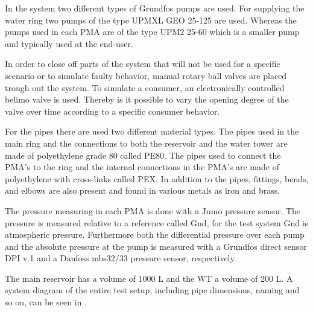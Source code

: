 In the system two different types of Grundfos pumps are used. For supplying the water ring two pumps of the type UPMXL GEO 25-125 are used. Whereas the pumps used in each PMA are of the type UPM2 25-60 which is a smaller pump and typically used at the end-user. 

In order to close off parts of the system that will not be used for a specific scenario or to simulate faulty behavior, manual rotary ball valves are placed trough out the system. 
To simulate a consumer, an electronically controlled belimo valve is used. Thereby is it possible to vary the opening degree of the valve over time according to a specific consumer behavior.   

For the pipes there are used two different material types. The pipes used in the main ring and the connections to both the reservoir and the water tower are made of polyethylene grade 80 called PE80. The pipes used to connect the PMA's to the ring and the internal connections in the PMA's are made of polyethylene with cross-links called PEX. In addition to the pipes, fittings, bends, and elbows are also present and found in various metals as iron and brass.     

The pressure measuring in each PMA is done with a Jumo pressure sensor. The pressure is measured relative to a reference called Gnd, for the test system Gnd is atmospheric pressure. Furthermore both the differential pressure over each pump and the absolute pressure at the pump is measured with a Grundfos direct sensor DPI v.1 and a Danfoss mbs32/33 pressure sensor, respectively.    

The main reservoir has a volume of 1000 L and the WT a volume of 200 L. A system diagram of the entire test setup, including pipe dimensions, naming and so on, can be seen in .